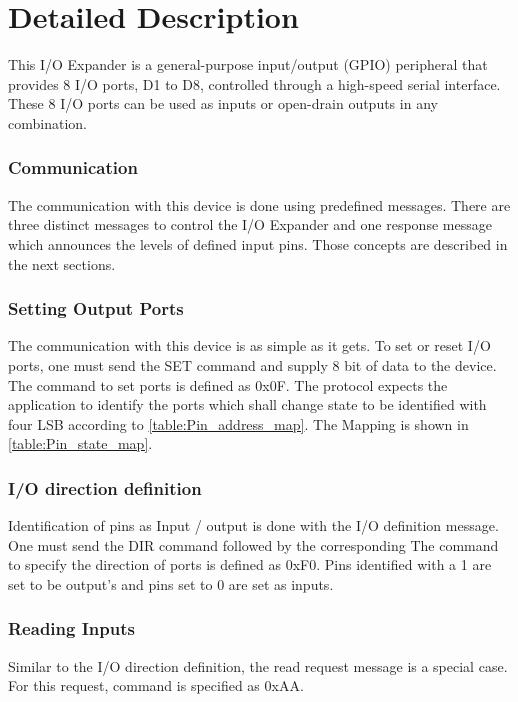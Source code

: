 \documentclass[10pt]{datasheet}
\begin{document}
\newpage
\twocolumn
\section{Detailed Description}

This I/O Expander is a general-purpose input/output (GPIO)
peripheral that provides 8 I/O ports, D1 to D8, controlled through a 
high-speed serial interface. These 8 I/O ports can be used as inputs or
open-drain outputs in any combination.

\subsubsection{Communication}
The communication with this device is done using predefined messages. There are 
three distinct messages to control the I/O Expander and one response message 
which announces the levels of defined input pins. Those concepts are described 
in the next sections.

\subsubsection{Setting Output Ports}
The communication with this device is as simple as it gets. To set or reset I/O 
ports, one must send the SET command and supply 8 bit of data to the device. 
The command to set ports is defined as 0x0F.
The protocol expects the application to identify the ports which shall change 
state to be identified with four LSB according to \ref{table:Pin_address_map}. 
The Mapping is shown in \ref{table:Pin_state_map}.

\vfill\break

\subsubsection{I/O direction definition}
Identification of pins as Input / output is done with the I/O definition 
message. One must send the DIR command followed by the corresponding 
The command to specify the direction of ports is defined as 0xF0.
Pins identified with a 1 are set to be output's and pins set to 
0 are set as inputs.

\subsubsection{Reading Inputs}
Similar to the I/O direction definition, the read request message is a special 
case. For this request, command is specified as 0xAA.
\end{document}
